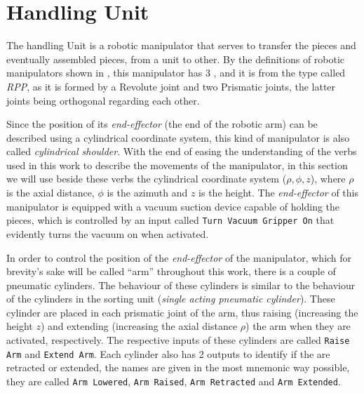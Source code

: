 \section{Handling Unit}
\label{sec:handlingUnit}
The handling Unit is a robotic manipulator that serves to transfer the pieces
and eventually assembled pieces, from a unit to other. By the definitions of
robotic manipulators shown in \cite{khalil2004modeling}, this manipulator has 3
\DOF{}, and it is from the type called \emph{RPP}, as
it is formed by a Revolute joint and two Prismatic joints, the latter joints
being orthogonal regarding each other.

Since the position of its
\emph{end-effector} (the end of the robotic arm) can be described using a
cylindrical coordinate system, this kind of manipulator is also called
\emph{cylindrical shoulder}. With the end of easing the understanding of the
verbs used in this work to describe the movements of the manipulator, in this
section we will use beside these verbs the cylindrical coordinate
system ($\rho,\phi,z$), where $\rho$ is the axial distance, $\phi$ is the azimuth
and $z$ is the height.
The \emph{end-effector} of this manipulator is equipped with a vacuum suction
device capable of holding the pieces, which is controlled by an input called
\verb|Turn Vacuum Gripper On| that evidently turns the vacuum on when activated.

In order to control the position of the \emph{end-effector} of the manipulator, which for brevity's sake will be called
``arm'' throughout this work, there is a couple of pneumatic cylinders. The
behaviour of these cylinders is similar
to the behaviour of the cylinders in the sorting unit (\emph{single acting
  pneumatic cylinder}). These cylinder are placed in each
prismatic joint of the arm, thus raising (increasing the height $z$) and extending (increasing the
axial distance $\rho$) the arm when they are activated, respectively. The
respective inputs
of these cylinders are called \verb|Raise Arm| and \verb|Extend Arm|. Each
cylinder also has 2 outputs to identify if the are retracted or extended, the
names are given in the most mnemonic way possible, they are called
\verb|Arm Lowered|, \verb|Arm Raised|, \verb|Arm Retracted| and
\verb|Arm Extended|.

